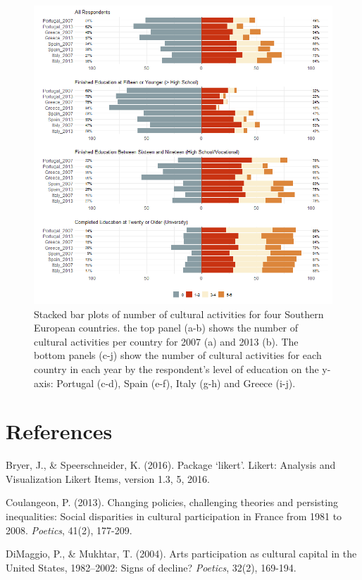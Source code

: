 \documentclass{article}
\begin{document}
\begin{figure}
    \centering
    \includegraphics[width=1.0\textwidth]{Plots/cult-cat-by-year-by-country-combo.png}
    \caption{Stacked bar plots of number of cultural activities for four Southern European countries. the top panel (a-b) shows the number of cultural activities per country for 2007 (a) and 2013 (b). The bottom panels (c-j) show the number of cultural activities for each country in each year by the respondent's level of education on the y-axis: Portugal (c-d), Spain (e-f), Italy (g-h) and Greece (i-j).}
    \label{fig: main}
\end{figure}

\section*{References}
\noindent

Bryer, J., \& Speerschneider, K. (2016). Package ‘likert’. Likert: Analysis and Visualization Likert Items, version 1.3, 5, 2016.

Coulangeon, P. (2013). Changing policies, challenging theories and persisting inequalities: Social disparities in cultural participation in France from 1981 to 2008. \textit{Poetics}, 41(2), 177-209.

DiMaggio, P., \& Mukhtar, T. (2004). Arts participation as cultural capital in the United States, 1982–2002: Signs of decline? \textit{Poetics}, 32(2), 169-194.
\end{document}
